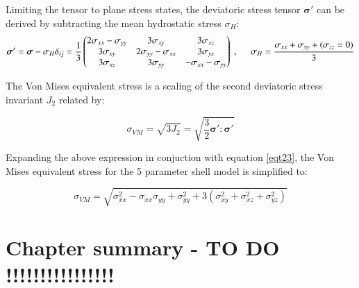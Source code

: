Limiting the tensor to plane stress states, the deviatoric stress tensor $\boldsymbol{\sigma}'$ can be derived by subtracting the mean hydrostatic stress $\sigma_{H}$:
\begin{equation} 
\boldsymbol{\sigma}' = \boldsymbol{\sigma} - \sigma_{H} \delta_{ij} = 
\frac{1}{3}
\begin{pmatrix}
2\sigma_{xx}-\sigma_{yy} & 3\sigma_{xy} & 3\sigma_{xz} \\
3\sigma_{xy} & 2\sigma_{yy}-\sigma_{xx} & 3\sigma_{yz} \\
3\sigma_{xz} & 3\sigma_{yy} & -\sigma_{xx}-\sigma_{yy} \\
\end{pmatrix}\ ,
\hspace{5mm}
\sigma_{H} = \frac{\sigma_{xx} + \sigma_{yy} + (\sigma_{zz} = 0)}{3}
\label{eqt23}
\end{equation}

The Von Mises equivalent stress is a scaling of the second deviatoric stress invariant $J_2$ related by:

\begin{equation} 
\sigma_{VM} = \sqrt{3J_2} = \sqrt{\frac{3}{2}\boldsymbol{\sigma}' : \boldsymbol{\sigma}'}
\label{eqt24}
\end{equation}

Expanding the above expression in conjuction with equation \ref{eqt23}, the Von Mises equivalent stress for the 5 parameter shell model is simplified to:

\begin{equation} 
\sigma_{VM} = 
\sqrt{
\sigma_{xx}^2
- \sigma_{xx}\sigma_{yy}
+ \sigma_{yy}^2
+ 3(\sigma_{xy}^2 + \sigma_{xz}^2 + \sigma_{yz}^2)
}
\label{eqt25}
\end{equation}

\section{Chapter summary - TO DO !!!!!!!!!!!!!!!!}